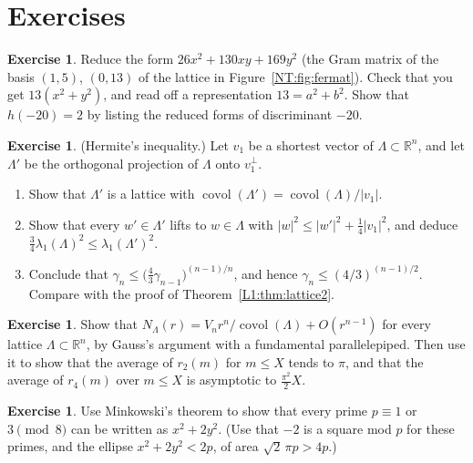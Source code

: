 \documentclass[11pt,openany]{book}
\theoremstyle{plain}
\theoremstyle{definition}
\newtheorem{exercise}[theorem]{Exercise}
\theoremstyle{remark}
\newcommand{\R}{\mathbb{R}}
\newcommand{\Lat}{\Lambda}             %
\newcommand{\covol}{\operatorname{covol}}
\newcommand{\abs}[1]{\left\lvert #1 \right\rvert}
\begin{document}
\section*{Exercises}

\begin{exercise}\label{NT:ex:reduce}
Reduce the form $26x^2+130xy+169y^2$ (the Gram matrix of the basis $(1,5)$, $(0,13)$ of the lattice in
Figure~\ref{NT:fig:fermat}). Check that you get $13(x^2+y^2)$, and read off a representation $13=a^2+b^2$.
Show that $h(-20)=2$ by listing the reduced forms of discriminant $-20$.
\end{exercise}

\begin{exercise}\label{NT:ex:hermite}
(Hermite's inequality.) Let $v_1$ be a shortest vector of $\Lat\subset\R^n$, and let $\Lat'$ be the
orthogonal projection of $\Lat$ onto $v_1^\perp$.
\begin{enumerate}[nosep]
\item Show that $\Lat'$ is a lattice with $\covol(\Lat')=\covol(\Lat)/\abs{v_1}$.
\item Show that every $w'\in\Lat'$ lifts to $w\in\Lat$ with $\abs{w}^2\le\abs{w'}^2+\frac14\abs{v_1}^2$, and
  deduce $\frac34\lambda_1(\Lat)^2\le\lambda_1(\Lat')^2$.
\item Conclude that $\gamma_n\le\big(\frac43\gamma_{n-1}\big)^{(n-1)/n}$, and hence $\gamma_n\le(4/3)^{(n-1)/2}$.
  Compare with the proof of Theorem~\ref{L1:thm:lattice2}.
\end{enumerate}
\end{exercise}

\begin{exercise}
Show that $N_\Lat(r)=V_nr^n/\covol(\Lat)+O(r^{n-1})$ for every lattice $\Lat\subset\R^n$, by Gauss's
argument with a fundamental parallelepiped. Then use it to show that the average of $r_2(m)$ for
$m\le X$ tends to $\pi$, and that the average of $r_4(m)$ over $m\le X$ is asymptotic to $\frac{\pi^2}{2}X$.
\end{exercise}

\begin{exercise}
Use Minkowski's theorem to show that every prime $p\equiv1$ or $3\pmod8$ can be written as $x^2+2y^2$.
(Use that $-2$ is a square mod $p$ for these primes, and the ellipse $x^2+2y^2<2p$, of area $\sqrt2\,\pi p>4p$.)
\end{exercise}
\end{document}
